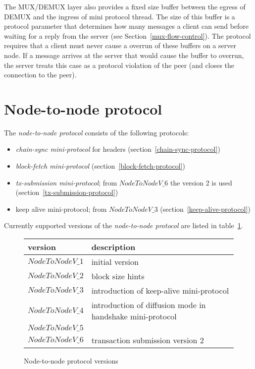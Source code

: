 The MUX/DEMUX layer also provides a fixed size buffer between the egress of DEMUX and the ingress
of mini protocol thread.
The size of this buffer is a protocol parameter that determines how many messages
a client can send before waiting for a reply from the server (see Section~\ref{mux-flow-control}).
The protocol requires that a client must never cause a overrun of these buffers on a server node.
If a message arrives at the server that would cause the buffer to overrun,
the server treats this case as a protocol violation of the peer
(and closes the connection to the peer).

\section{Node-to-node protocol}
\label{section:node-to-node-protocol}
\newline
{}\newline

The \textit{node-to-node protocol} consists of the following protocols:
\begin{itemize}
  \item \textit{chain-sync mini-protocol} for headers (section~\ref{chain-sync-protocol})
  \item \textit{block-fetch mini-protocol} (section~\ref{block-fetch-protocol})
  \item \textit{tx-submission mini-protocol};  from $NodeToNodeV\_6$ the version
    2 is used  (section~\ref{tx-submission-protocol})
  \item keep alive mini-protocol; from $NodeToNodeV\_3$ (section~\ref{keep-alive-protocol})
\end{itemize}
Currently supported versions of the \textit{node-to-node protocol} are listed
in table~\ref{table:node-to-node-protocol-versions}.
\begin{figure}[h]
  \begin{center}
    \begin{tabular}{l|l}
      version         & description \\\hline\hline
      $NodeToNodeV\_1$ & initial version \\\hline
      $NodeToNodeV\_2$ & block size hints \\\hline
      $NodeToNodeV\_3$ & introduction of keep-alive mini-protocol \\\hline
      $NodeToNodeV\_4$ & introduction of diffusion mode in handshake mini-protocol \\\hline
      $NodeToNodeV\_5$ & \\\hline
      $NodeToNodeV\_6$ & transaction submission version 2 \\\hline
    \end{tabular}
    \caption{Node-to-node protocol versions}
    \label{table:node-to-node-protocol-versions}
  \end{center}
\end{figure}

